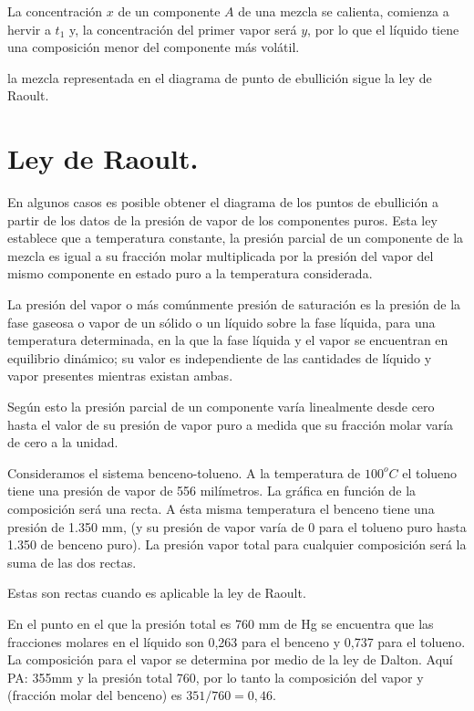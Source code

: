 \documentclass[11pt,openany]{book}
\begin{document}
La concentración $x$ de un componente $A$ de una mezcla se calienta, comienza a hervir a $t_1$ y, la 
concentración del primer vapor será $y$, por lo que el líquido tiene una composición menor del componente más volátil.

la mezcla representada en el diagrama de punto de ebullición sigue la ley de Raoult.

\section{Ley de Raoult.}

En algunos casos es posible obtener el diagrama de los puntos de ebullición a partir de los datos de
 la presión de vapor de los componentes puros. Esta ley establece que a temperatura constante, la 
 presión parcial de un componente de la mezcla es igual a su fracción molar multiplicada por la 
 presión del vapor del mismo componente en estado puro a la temperatura considerada.

 La presión del vapor o más comúnmente presión de saturación es la presión de la fase gaseosa o 
 vapor de un sólido o un líquido sobre la fase líquida, para una temperatura determinada, en la que 
 la fase líquida y el vapor se encuentran en equilibrio dinámico; su valor es independiente de las 
 cantidades de líquido y vapor presentes mientras existan ambas.

 Según esto la presión parcial de un componente varía linealmente desde cero hasta el valor de su 
 presión de vapor puro a medida que su fracción molar varía de cero a la unidad.

 Consideramos el sistema benceno-tolueno. A la temperatura de $100^oC$ el tolueno tiene una presión 
 de vapor de 556 milímetros. La gráfica en función de la composición será una recta. A ésta misma 
 temperatura el benceno tiene una presión de 1.350 mm, (y su presión de vapor varía de 0 para el
  tolueno puro hasta 1.350 de benceno puro). La presión vapor total para cualquier composición será 
  la suma de las dos rectas.

  Estas son rectas cuando es aplicable la ley de Raoult.

  En el punto en el que la presión total es 760 mm de Hg se encuentra que las fracciones molares en 
  el líquido son 0,263 para el benceno y 0,737 para el tolueno. La composición para el vapor se 
  determina por medio de la ley de Dalton. Aquí PA: 355mm y la presión total 760, por lo tanto la 
  composición del vapor y (fracción molar del benceno) es $351/760=0,46$.
  \newline
  \newline
\end{document}
